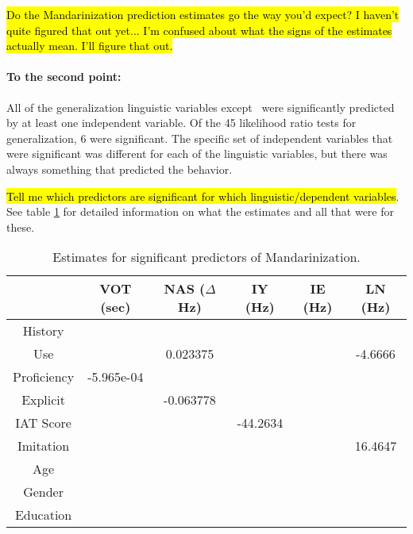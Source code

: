 \hl{Do the Mandarinization prediction estimates go the way you'd expect? I haven't quite figured that out yet... I'm confused about what the signs of the estimates actually mean. I'll figure that out.}

\paragraph{To the second point:}
All of the generalization linguistic variables except \degdip~were significantly predicted by at least one independent variable. Of the 45 likelihood ratio tests for generalization, 6 were significant. The specific set of independent variables that were significant was different for each of the linguistic variables, but there was always something that predicted the behavior.

\hl{Tell me which predictors are significant for which linguistic/dependent variables}. See table \ref{tab:sigGenPredEsts} for detailed information on what the estimates and all that were for these.

\begin{table}[]
    \centering
    \begin{tabular}{|c|c|c|c|c|c|}
        \hline
         & VOT (sec) & NAS ($\Delta$Hz) & IY (Hz) & IE (Hz) & LN (Hz)\\
        \hline
        History & \cellcolor{lightgray} & \cellcolor{lightgray} & \cellcolor{lightgray} & \cellcolor{lightgray} & \cellcolor{lightgray} \\
        \hline
        Use & \cellcolor{lightgray} & 0.023375 & \cellcolor{lightgray} & \cellcolor{lightgray} & -4.6666 \\
        \hline
        Proficiency & -5.965e-04 & \cellcolor{lightgray} & \cellcolor{lightgray} & \cellcolor{lightgray} & \cellcolor{lightgray} \\
        \hline
        Explicit & \cellcolor{lightgray} & -0.063778 & \cellcolor{lightgray} & \cellcolor{lightgray} & \cellcolor{lightgray} \\
        \hline
        IAT Score & \cellcolor{lightgray} & \cellcolor{lightgray} & -44.2634 & \cellcolor{lightgray} & \cellcolor{lightgray} \\
        \hline
        Imitation & \cellcolor{lightgray} & \cellcolor{lightgray} & \cellcolor{lightgray} & \cellcolor{lightgray} & 16.4647 \\
        \hline
        Age & \cellcolor{lightgray} & \cellcolor{lightgray} & \cellcolor{lightgray} & \cellcolor{lightgray} & \cellcolor{lightgray} \\
        \hline
        Gender & \cellcolor{lightgray} & \cellcolor{lightgray} & \cellcolor{lightgray} & \cellcolor{lightgray} & \cellcolor{lightgray} \\
        \hline
        Education & \cellcolor{lightgray} & \cellcolor{lightgray} & \cellcolor{lightgray} & \cellcolor{lightgray} & \cellcolor{lightgray} \\
        \hline
    \end{tabular}
    \caption{Estimates for significant predictors of Mandarinization.}
    \label{tab:sigGenPredEsts}
\end{table}


